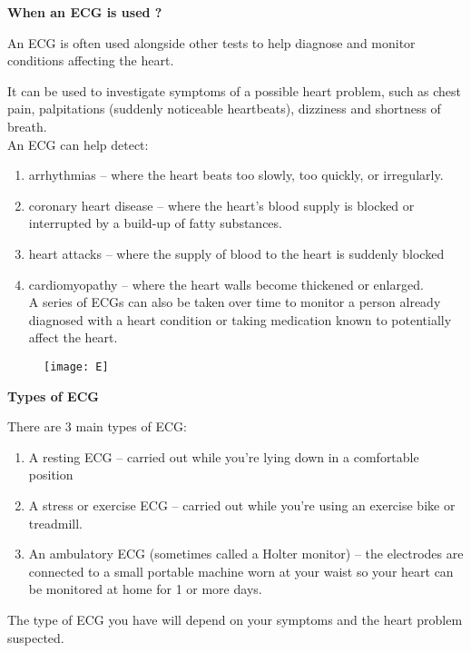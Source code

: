 \documentclass[12pt]{article}
\begin{document}
\LARGE\flushleft\textbf{When an ECG is used ?}

\large\flushleft An ECG is often used alongside other tests to help diagnose and monitor conditions affecting the heart.

It can be used to investigate symptoms of a possible heart problem, such as chest pain, palpitations (suddenly noticeable heartbeats), dizziness and shortness of breath.\\

An ECG can help detect:\\

\begin{enumerate}
\item arrhythmias – where the heart beats too slowly, too quickly, or irregularly.\\
\item coronary heart disease – where the heart's blood supply is blocked or interrupted by a build-up of fatty substances.\\
\item heart attacks – where the supply of blood to the heart is suddenly blocked\\
\item cardiomyopathy – where the heart walls become thickened or enlarged.\\
A series of ECGs can also be taken over time to monitor a person already diagnosed with a heart condition or taking medication known to potentially affect the heart.

\end{enumerate}

\vspace{1cm}


\begin{figure}[h]
\centering
\texttt{[image: E]}
\end{figure}

\pagebreak

\LARGE\flushleft\textbf{Types of ECG}

\large\flushleft There are 3 main types of ECG:\\

\begin{enumerate}
\item A resting ECG – carried out while you're lying down in a comfortable position\\
\item A stress or exercise ECG – carried out while you're using an exercise bike or treadmill.\\
\item An ambulatory ECG (sometimes called a Holter monitor) – the electrodes are connected to a small portable machine worn at your waist so your heart can be monitored at home for 1 or more days.\\

\end{enumerate}
The type of ECG you have will depend on your symptoms and the heart problem suspected.\\
\end{document}
